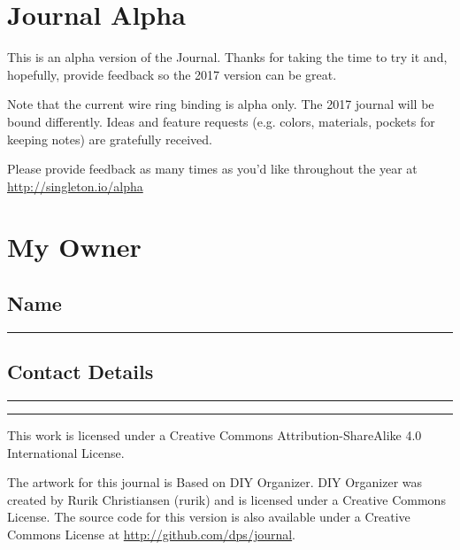 \section{Journal Alpha}

This is an alpha version of the Journal.  Thanks for taking the time to try it and, hopefully, provide feedback so the 2017 version can be great.

Note that the current wire ring binding is alpha only.  The 2017 journal will be bound differently.  Ideas and feature requests (e.g. colors, materials, pockets for keeping notes) are gratefully received.

Please provide feedback as many times as you'd like throughout the year at \url{http://singleton.io/alpha}


\section{My Owner}

\subsection{Name}
{\color{WriteBgMain}
\rule{\textwidth}{1pt}\par}

\subsection{Contact Details}
{\color{WriteBgMain}
\rule{\textwidth}{1pt}\par
\rule{\textwidth}{1pt}\par}

\pagebreak
This work is licensed under a Creative Commons Attribution-ShareAlike 4.0 International License.

The artwork for this journal is Based on DIY Organizer.  DIY Organizer was created by Rurik Christiansen (rurik) and is licensed under a Creative Commons License.  The source code for this version is also available under a Creative Commons License at \url{http://github.com/dps/journal}.

\pagebreak
